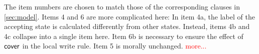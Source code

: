 \begin{definition}
\begin{enumerate}
\end{enumerate}
\end{definition}


The item numbers are chosen to match those of the corresponding clauses in
\textsection\ref{sec:model}.  Items 4 and 6 are more complicated here:
In item 4a, the label of the accepting state is calculated differently from
other states. Instead, items 4b and 4c collapse into a single item here.
Item 6b is necessary to ensure the effect of $\relfilt{}$ in the local write
rule.  Item 5 is morally unchanged. \textcolor{red}{more...
}

